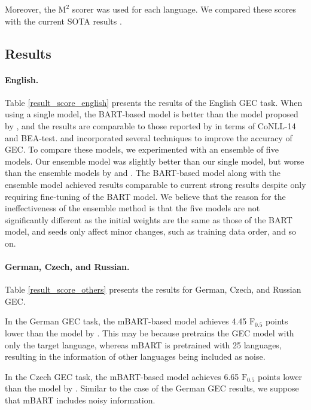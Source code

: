 \documentclass[11pt,a4paper]{article}
\begin{document}
Moreover, the $\mathrm{M^2}$ scorer was used for each language.
We compared these scores with the current SOTA results \cite{low_resource_gec}.


\subsection{Results}
\paragraph{English.}
Table \ref{result_score_english} presents the results of the English GEC task.
When using a single model, the BART-based model is better than the model proposed by \citet{kiyono2019}, and the results are comparable to those reported by \citet{kaneko_bert} in terms of CoNLL-14 and BEA-test.
\citet{kiyono2019} and \citet{kaneko_bert} incorporated several techniques to improve the accuracy of GEC.
To compare these models, we experimented with an ensemble of five models.
Our ensemble model was slightly better than our single model, but worse than the ensemble models by \citet{kiyono2019} and \citet{kaneko_bert}.
The BART-based model along with the ensemble model achieved results comparable to current strong results despite only requiring fine-tuning of the BART model.
We believe that the reason for the ineffectiveness of the ensemble method is that the five models are not significantly different
 as the initial weights are the same as those of the BART model,
 and seeds only affect minor changes, such as training data order, and so on.


\paragraph{German, Czech, and Russian.}
Table \ref{result_score_others} presents the results for German, Czech, and Russian GEC.

In the German GEC task, the mBART-based model achieves 4.45 $\mathrm{F_{0.5}}$ points lower than the model by \citet{low_resource_gec}.
This may be because \citet{low_resource_gec} pretrains the GEC model with only the target language,
 whereas mBART is pretrained with 25 languages, resulting in
 the information of other languages being included as noise.

In the Czech GEC task, the mBART-based model achieves 6.65 $\mathrm{F_{0.5}}$ points lower than the model by \citet{low_resource_gec}.
Similar to the case of the German GEC results, we suppose that mBART includes noisy information.
\end{document}
